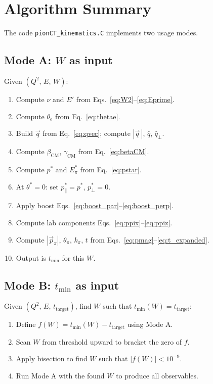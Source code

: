 \documentclass[12pt,a4paper]{article}
\begin{document}
\section{Algorithm Summary}

The code \texttt{pionCT\_kinematics.C} implements two usage modes.

\subsection{Mode A: $W$ as input}

Given $(Q^2,\, E,\, W)$:
\begin{enumerate}[label=\arabic*.]
  \item Compute $\nu$ and $E'$ from Eqs.~\eqref{eq:W2}--\eqref{eq:Eprime}.
  \item Compute $\theta_e$ from Eq.~\eqref{eq:thetae}.
  \item Build $\vec{q}$ from Eq.~\eqref{eq:qvec}; compute $|\vec{q}\,|$,
    $\hat{q}$, $\hat{q}_\perp$.
  \item Compute $\beta_\text{CM}$, $\gamma_\text{CM}$ from
    Eq.~\eqref{eq:betaCM}.
  \item Compute $p^*$ and $E_\pi^*$ from Eq.~\eqref{eq:pstar}.
  \item At $\theta^* = 0$: set $p_\parallel^* = p^*$, $p_\perp^* = 0$.
  \item Apply boost Eqs.~\eqref{eq:boost_par}--\eqref{eq:boost_perp}.
  \item Compute lab components Eqs.~\eqref{eq:ppix}--\eqref{eq:ppiz}.
  \item Compute $|\vec{p}_\pi|$, $\theta_\pi$, $k_\pi$, $t$ from
    Eqs.~\eqref{eq:pmag}--\eqref{eq:t_expanded}.
  \item Output is $t_\text{min}$ for this $W$.
\end{enumerate}

\subsection{Mode B: $t_\text{min}$ as input}

Given $(Q^2,\, E,\, t_\text{target})$, find $W$ such that
$t_\text{min}(W) = t_\text{target}$:
\begin{enumerate}[label=\arabic*.]
  \item Define $f(W) = t_\text{min}(W) - t_\text{target}$ using Mode A.
  \item Scan $W$ from threshold upward to bracket the zero of $f$.
  \item Apply bisection to find $W$ such that $|f(W)| < 10^{-9}$.
  \item Run Mode A with the found $W$ to produce all observables.
\end{enumerate}
\end{document}
